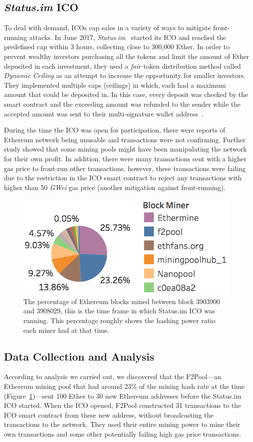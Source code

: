 \subsection{\textit{Status.im} ICO}
To deal with demand, ICOs cap sales in a variety of ways to mitigate front-running attacks. In June 2017, \textit{Status.im}~\cite{statuswhitepaper} started its ICO and reached the predefined cap within 3 hours, collecting close to 300,000 Ether. In order to prevent wealthy investors purchasing all the tokens and limit the amount of Ether deposited in each investment, they used a \textit{fair} token distribution method called \textit{Dynamic Ceiling} as an attempt to increase the opportunity for smaller investors. They implemented multiple caps (ceilings) in which, each had a maximum amount that could be deposited in. In this case, every deposit was checked by the smart contract and the exceeding amount was refunded to the sender while the accepted amount was sent to their multi-signature wallet address~\cite{statusicoanalysis}.

During the time the ICO was open for participation, there were reports of Ethereum network being unusable and transactions were not confirming. Further study showed that some mining pools might have been manipulating the network for their own profit. In addition, there were many transactions sent with a higher gas price to front-run other transactions, however, these transactions were failing due to the restriction in the ICO smart contract to reject any transactions with higher than 50 \textit{GWei} gas price (another mitigation against front-running).

\begin{figure}[t]
\centering
\includegraphics[width=0.5\linewidth]{figures/Mining_pool_ratio.png}
\caption{ The percentage of Ethereum blocks mined between block 3903900 and 3908029, this is the time frame in which Status.im ICO was running. This percentage roughly shows the hashing power ratio each miner had at that time. \label{fig:mining_pool_ratio}} %
\end{figure}

\subsection{Data Collection and Analysis}
According to analysis we carried out, we discovered that the F2Pool---an Ethereum mining pool that had around 23\% of the mining hash rate at the time (Figure~\ref{fig:mining_pool_ratio})---sent 100 Ether to 30 new Ethereum addresses before the Status.im ICO started. When the ICO opened, F2Pool constructed 31 transactions to the ICO smart contract from these new address, without broadcasting the transactions to the network. They used their entire mining power to mine their own transactions and some other potentially failing high gas price transactions.

